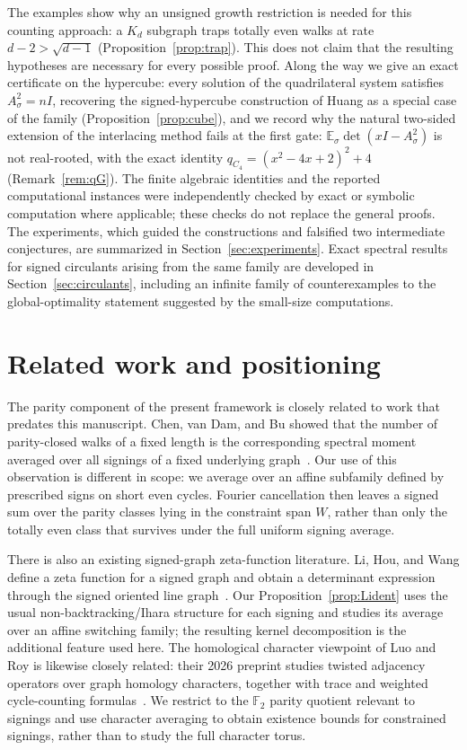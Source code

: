 \documentclass[11pt]{article}
\theoremstyle{remark}
\begin{document}
The examples show why an unsigned growth restriction is needed for this
counting approach: a $K_d$ subgraph traps totally even walks at rate
$d-2>\sqrt{d-1}$ (Proposition~\ref{prop:trap}). This does not claim that the
resulting hypotheses are necessary for every possible proof. Along the way we give an exact
certificate on the hypercube: every solution of the quadrilateral
system satisfies $A_\sigma^2=nI$, recovering the signed-hypercube construction of Huang
\cite{huang19} as a special case of the family
(Proposition~\ref{prop:cube}), and we record why the natural
two-sided extension of the interlacing method fails at the first
gate: $\mathbb E_\sigma\det(xI-A_\sigma^2)$ is not real-rooted, with
the exact identity $q_{C_4}=(x^2-4x+2)^2+4$
(Remark~\ref{rem:qG}). The finite algebraic identities and the reported computational
instances were independently checked by exact or symbolic computation
where applicable; these checks do not replace the general proofs. The
experiments, which guided the constructions and falsified two
intermediate conjectures,
are summarized in Section~\ref{sec:experiments}. Exact spectral
results for signed circulants arising from the same family are developed in
Section~\ref{sec:circulants}, including an infinite family of counterexamples to the
global-optimality statement suggested by the small-size computations.



\section{Related work and positioning}\label{sec:related}

The parity component of the present framework is closely related to work that
predates this manuscript. Chen, van Dam, and Bu showed that the number of
parity-closed walks of a fixed length is the corresponding spectral moment
averaged over all signings of a fixed underlying graph~\cite{chenvandambu24}.
Our use of this observation is different in scope: we average over an affine
subfamily defined by prescribed signs on short even cycles. Fourier cancellation
then leaves a signed sum over the parity classes lying in the constraint span
$W$, rather than only the totally even class that survives under the full uniform
signing average.

There is also an existing signed-graph zeta-function literature. Li, Hou, and
Wang define a zeta function for a signed graph and obtain a determinant expression
through the signed oriented line graph~\cite{lihouwang24}. Our Proposition~\ref{prop:Lident}
uses the usual non-backtracking/Ihara structure for each signing and studies its
average over an affine switching family; the resulting kernel decomposition is
the additional feature used here. The homological character viewpoint of
Luo and Roy is likewise closely related: their 2026 preprint studies twisted
adjacency operators over graph homology characters, together with trace and
weighted cycle-counting formulas~\cite{luoroy24}. We restrict to the
$\mathbb F_2$ parity quotient relevant to signings and use character averaging
to obtain existence bounds for constrained signings, rather than to study the
full character torus.
\end{document}
